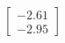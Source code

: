\documentclass[preview]{standalone}
\begin{document}
\begin{align*}
\begin{bmatrix} -2.61 \\ -2.95 \end{bmatrix}
\end{align*}
\end{document}
